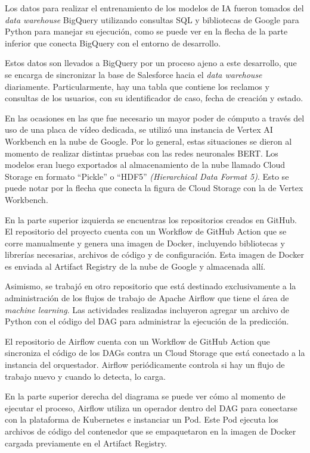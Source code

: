 Los datos para realizar el entrenamiento de los modelos de IA fueron tomados del \textit{data warehouse} BigQuery utilizando consultas SQL y bibliotecas de Google para Python para manejar su ejecución, como se puede ver en la flecha de la parte inferior que conecta BigQuery con el entorno de desarrollo.

Estos datos son llevados a BigQuery por un proceso ajeno a este desarrollo, que se encarga de sincronizar la base de Salesforce hacia el \textit{data warehouse} diariamente. Particularmente, hay una tabla que contiene los reclamos y consultas de los usuarios, con su identificador de caso, fecha de creación y estado.

En las ocasiones en las que fue necesario un mayor poder de cómputo a través del uso de una placa de vídeo dedicada, se utilizó una instancia de Vertex AI Workbench en la nube de Google. Por lo general, estas situaciones se dieron al momento de realizar distintas pruebas con las redes neuronales BERT. Los modelos eran luego exportados al almacenamiento de la nube llamado Cloud Storage en formato ``Pickle'' o ``HDF5'' \textit{(Hierarchical Data Format 5)}. Esto se puede notar por la flecha que conecta la figura de Cloud Storage con la de Vertex Workbench.

En la parte superior izquierda se encuentras los repositorios creados en GitHub. El repositorio del proyecto cuenta con un Workflow de GitHub Action que se corre manualmente y genera una imagen de Docker, incluyendo bibliotecas y librerías necesarias, archivos de código y de configuración. Esta imagen de Docker es enviada al Artifact Registry de la nube de Google y almacenada allí.

Asimismo, se trabajó en otro repositorio que está destinado exclusivamente a la administración de los flujos de trabajo de Apache Airflow que tiene el área de \textit{machine learning}. Las actividades realizadas incluyeron agregar un archivo de Python con el código del DAG para administrar la ejecución de la predicción.

El repositorio de Airflow cuenta con un Workflow de GitHub Action que sincroniza el código de los DAGs contra un Cloud Storage que está conectado a la instancia del orquestador. Airflow periódicamente controla si hay un flujo de trabajo nuevo y cuando lo detecta, lo carga.

En la parte superior derecha del diagrama se puede ver cómo al momento de ejecutar el proceso, Airflow utiliza un operador dentro del DAG para conectarse con la plataforma de Kubernetes e instanciar un Pod. Este Pod ejecuta los archivos de código del contenedor que se empaquetaron en la imagen de Docker cargada previamente en el Artifact Registry.

